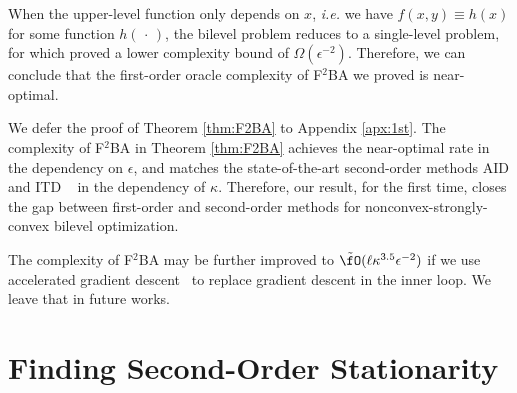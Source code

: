 \documentclass{article}
\begin{document}
\begin{rmk} 
When the upper-level function only depends on $x$, \textit{i.e.}
we have $f(x,y) \equiv h(x)$ for some function $h(\,\cdot\,)$, the bilevel problem reduces to a single-level problem, for which \citet{carmon2020lower} proved a lower complexity bound of $\Omega(\epsilon^{-2})$. Therefore, we can conclude that the
first-order oracle complexity of {F${}^2$BA} we proved is near-optimal. 
\end{rmk}

We defer the proof of Theorem \ref{thm:F2BA} to Appendix \ref{apx:1st}. The complexity of F${}^2$BA in Theorem \ref{thm:F2BA}
achieves the near-optimal rate in the dependency on $\epsilon$, and matches the state-of-the-art second-order methods AID and ITD ~\citep{ji2021bilevel} in the dependency of $\kappa$. Therefore,
our result, for the first time, closes the gap between first-order and second-order methods for nonconvex-strongly-convex bilevel optimization.

\begin{rmk}
The complexity of {F${}^2$BA} may be further improved to $\tilde \fO(\ell \kappa^{3.5} \epsilon^{-2})$ if we use accelerated gradient descent~\citep{nesterov2018lectures} to replace gradient descent in the inner loop. We leave that in future works.
\end{rmk}

\section{Finding Second-Order Stationarity} \label{sec:second}
\end{document}
